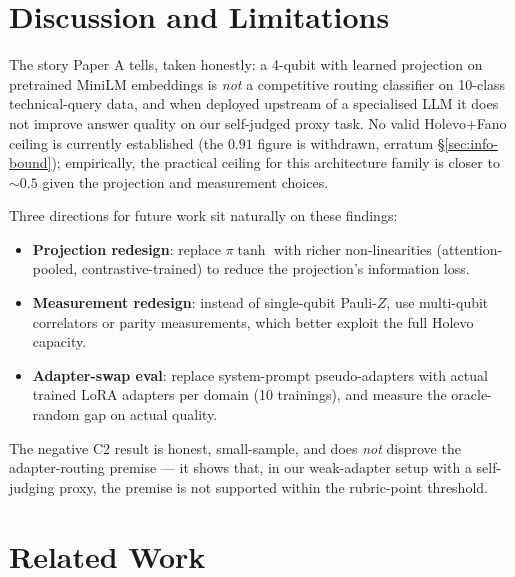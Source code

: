 \section{Discussion and Limitations}

The story Paper A tells, taken honestly: a 4-qubit \vqc{} with learned projection on pretrained MiniLM embeddings is \emph{not} a competitive routing classifier on 10-class technical-query data, and when deployed upstream of a specialised LLM it does not improve answer quality on our self-judged proxy task. No valid Holevo+Fano ceiling is currently established (the $0.91$ figure is withdrawn, erratum \S\ref{sec:info-bound}); empirically, the practical ceiling for this architecture family is closer to $\sim 0.5$ given the projection and measurement choices.

Three directions for future work sit naturally on these findings:
\begin{itemize}
\item \textbf{Projection redesign}: replace $\pi \tanh$ with richer non-linearities (attention-pooled, contrastive-trained) to reduce the projection's information loss.
\item \textbf{Measurement redesign}: instead of single-qubit Pauli-$Z$, use multi-qubit correlators or parity measurements, which better exploit the full Holevo capacity.
\item \textbf{Adapter-swap eval}: replace system-prompt pseudo-adapters with actual trained LoRA adapters per domain (10 trainings), and measure the oracle-random gap on actual quality.
\end{itemize}

The negative C2 result is honest, small-sample, and does \emph{not} disprove the adapter-routing premise --- it shows that, in our weak-adapter setup with a self-judging proxy, the premise is not supported within the rubric-point threshold.

\section{Related Work}

